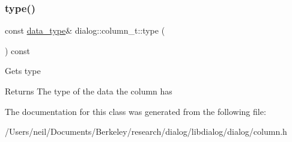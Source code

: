 \subsubsection{\texorpdfstring{type()}{type()}}
{\footnotesize\ttfamily const \hyperlink{structdialog_1_1data__type}{data\+\_\+type}\& dialog\+::column\+\_\+t\+::type (\begin{DoxyParamCaption}{ }\end{DoxyParamCaption}) const\hspace{0.3cm}{\ttfamily [inline]}}

Gets type \begin{DoxyReturn}{Returns}
The type of the data the column has 
\end{DoxyReturn}


The documentation for this class was generated from the following file\+:\begin{DoxyCompactItemize}
\item 
/\+Users/neil/\+Documents/\+Berkeley/research/dialog/libdialog/dialog/column.\+h\end{DoxyCompactItemize}
